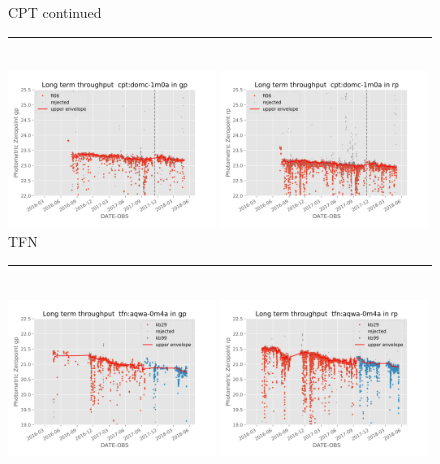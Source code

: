 \documentclass[]{spie}
\begin{document}
\begin{figure}\ContinuedFloat
\centering
CPT continued \\ 
\rule{\textwidth}{0.4pt} \\
\includegraphics[width=0.49\textwidth]{images/photzptrend-cpt-domc-1m0a-gp.png} \hspace*{\fill} 
\includegraphics[width=0.49\textwidth]{images/photzptrend-cpt-domc-1m0a-rp.png} \\[1ex]
TFN \\ 
\rule{\textwidth}{0.4pt} \\
\includegraphics[width=0.49\textwidth]{images/photzptrend-tfn-aqwa-0m4a-gp.png} \hspace*{\fill}
\includegraphics[width=0.49\textwidth]{images/photzptrend-tfn-aqwa-0m4a-rp.png} \\

\end{figure}
\end{document}
